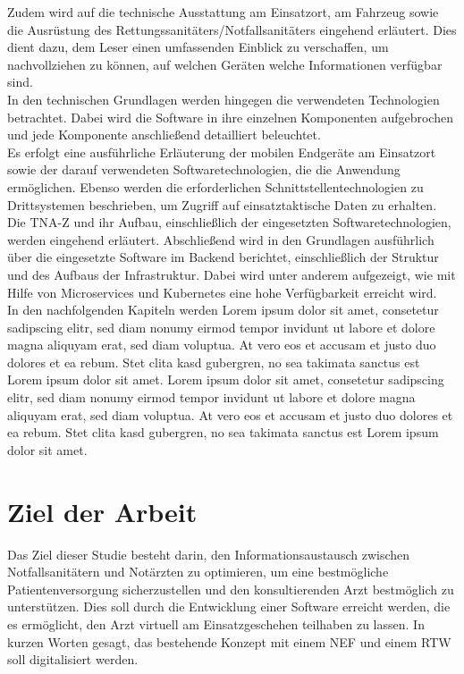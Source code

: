 Zudem wird auf die technische Ausstattung am Einsatzort, am Fahrzeug sowie die Ausrüstung des Rettungssanitäters/Notfallsanitäters eingehend erläutert. Dies dient dazu, dem Leser einen umfassenden Einblick zu verschaffen, um nachvollziehen zu können, auf welchen Geräten welche Informationen verfügbar sind.  \\


In den technischen Grundlagen werden hingegen die verwendeten Technologien betrachtet. Dabei wird die Software in ihre einzelnen Komponenten aufgebrochen und jede Komponente anschließend detailliert beleuchtet. \\

Es erfolgt eine ausführliche Erläuterung der mobilen Endgeräte am Einsatzort sowie der darauf verwendeten Softwaretechnologien, die die Anwendung ermöglichen. Ebenso werden die erforderlichen Schnittstellentechnologien zu Drittsystemen beschrieben, um Zugriff auf einsatztaktische Daten zu erhalten.\\

Die \ac{TNA-Z} und ihr Aufbau, einschließlich der eingesetzten Softwaretechnologien, werden eingehend erläutert. Abschließend wird in den Grundlagen ausführlich über die eingesetzte Software im Backend berichtet, einschließlich der Struktur und des Aufbaus der Infrastruktur. Dabei wird unter anderem aufgezeigt, wie mit Hilfe von Microservices und Kubernetes eine hohe Verfügbarkeit erreicht wird.\\

In den nachfolgenden Kapiteln werden Lorem ipsum dolor sit amet, consetetur sadipscing elitr, sed diam nonumy eirmod tempor invidunt ut labore et dolore magna aliquyam erat, sed diam voluptua. At vero eos et accusam et justo duo dolores et ea rebum. Stet clita kasd gubergren, no sea takimata sanctus est Lorem ipsum dolor sit amet. Lorem ipsum dolor sit amet, consetetur sadipscing elitr, sed diam nonumy eirmod tempor invidunt ut labore et dolore magna aliquyam erat, sed diam voluptua. At vero eos et accusam et justo duo dolores et ea rebum. Stet clita kasd gubergren, no sea takimata sanctus est Lorem ipsum dolor sit amet. \\


\section{Ziel der Arbeit}
Das Ziel dieser Studie besteht darin,
den Informationsaustausch zwischen Notfallsanitätern und Notärzten zu optimieren, um eine bestmögliche Patientenversorgung sicherzustellen und den konsultierenden Arzt bestmöglich zu unterstützen. Dies soll durch die Entwicklung einer Software erreicht werden, die es ermöglicht, den Arzt virtuell am Einsatzgeschehen teilhaben zu lassen. In kurzen Worten gesagt, das bestehende Konzept mit einem \ac{NEF} und einem \ac{RTW} soll digitalisiert werden.

